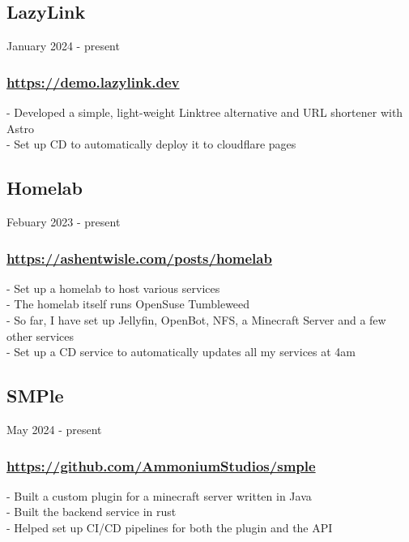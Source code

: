 \subsection{LazyLink} January 2024 - present \\
\subsubsection{\href{https://demo.lazylink.dev}{https://demo.lazylink.dev}}
-\: Developed a simple, light-weight Linktree alternative and URL shortener with Astro \\
-\: Set up CD to automatically deploy it to cloudflare pages \\

\subsection{Homelab} Febuary 2023 - present \\
\subsubsection{\href{https://ashentwisle.com/posts/homelab-go-brrr}{https://ashentwisle.com/posts/homelab}}
-\:  Set up a homelab to host various services \\
-\:  The homelab itself runs OpenSuse Tumbleweed \\
-\:  So far, I have set up Jellyfin, OpenBot, NFS, a Minecraft Server and a few other services \\
-\:  Set up a CD service to automatically updates all my services at 4am \\

\subsection{SMPle} May 2024 - present \\
\subsubsection{\href{https://github.com/AmmoniumStudios/smple}{https://github.com/AmmoniumStudios/smple}}
-\:  Built a custom plugin for a minecraft server written in Java \\
-\:  Built the backend service in rust \\
-\:  Helped set up CI/CD pipelines for both the plugin and the API \\

